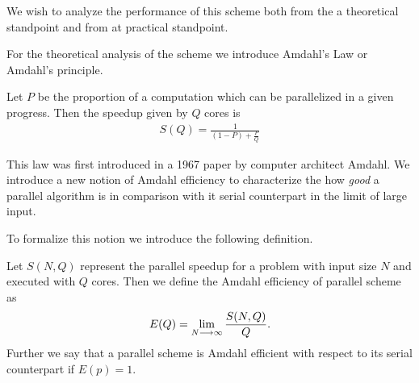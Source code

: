 We wish to analyze the performance of this scheme both from the a theoretical standpoint and from at practical standpoint. 

For the theoretical analysis of the scheme we introduce Amdahl's Law or Amdahl's principle.
\begin{principle}[Amdahl]
Let $ P $ be the proportion of a computation which can be parallelized in a given progress. Then the speedup given by
$ Q $ cores is
\begin{align*}
	S(Q) = \frac{1}{(1-P)+\frac{P}{Q}}
\end{align*}

\end{principle}

This law was first introduced in a 1967 paper by computer architect Amdahl. We introduce a new notion of Amdahl efficiency to characterize the how \emph{good} a parallel algorithm is in comparison with it serial counterpart in the limit of large input. 

To formalize this notion we introduce the following definition.

\begin{definition}
\label{def:amdahl_efficient}
    Let $ S(N,Q) $ represent the parallel speedup for a problem with input size $ N $ and executed with $ Q $ cores.
    Then we define the Amdahl efficiency of parallel scheme as 
    \begin{align*}
        E(Q) = \lim_{N \longrightarrow \infty} \frac{S(N, Q)}{Q}.
    \end{align*}
    Further we say that a parallel scheme is Amdahl efficient with respect to its serial counterpart if $ E(p) = 1 $.
\end{definition}

